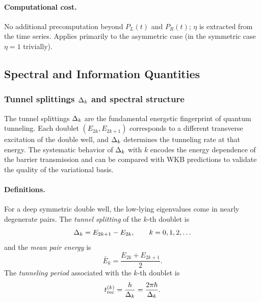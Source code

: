 \paragraph{Computational cost.}
No additional precomputation beyond $P_L(t)$ and $P_R(t)$; $\eta$ is extracted from the time series.
Applies primarily to the asymmetric case (in the symmetric case $\eta = 1$ trivially).

\subsection{Spectral and Information Quantities}\label{sec:spectral}

\subsubsection{Tunnel splittings $\Delta_k$ and spectral structure}\label{sec:splittings}

\begin{remark}
The tunnel splittings $\Delta_k$ are the fundamental energetic fingerprint of quantum tunneling.
Each doublet $(E_{2k}, E_{2k+1})$ corresponds to a different transverse excitation of the double well, and $\Delta_k$ determines the tunneling rate at that energy.
The systematic behavior of $\Delta_k$ with $k$ encodes the energy dependence of the barrier transmission and can be compared with WKB predictions to validate the quality of the variational basis.
\end{remark}

\paragraph{Definitions.}

For a deep symmetric double well, the low-lying eigenvalues come in nearly degenerate pairs.
The \emph{tunnel splitting} of the $k$-th doublet is
\begin{equation}\label{eq:Delta_k}
  \Delta_k = E_{2k+1} - E_{2k}, \qquad k = 0, 1, 2, \ldots
\end{equation}
and the \emph{mean pair energy} is
\begin{equation}\label{eq:Ebar_k}
  \bar{E}_k = \frac{E_{2k} + E_{2k+1}}{2}.
\end{equation}
The \emph{tunneling period} associated with the $k$-th doublet is
\begin{equation}\label{eq:t_r_k}
  t_{\text{rec}}^{(k)} = \frac{h}{\Delta_k} = \frac{2\pi\hbar}{\Delta_k}.
\end{equation}

